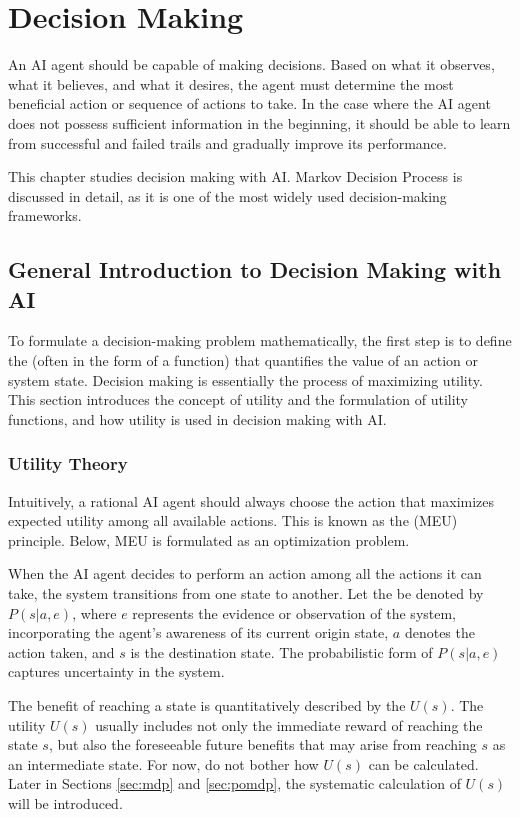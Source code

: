 \chapter{Decision Making}

An AI agent should be capable of making decisions. Based on what it observes, what it believes, and what it desires, the agent must determine the most beneficial action or sequence of actions to take. In the case where the AI agent does not possess sufficient information in the beginning, it should be able to learn from successful and failed trails and gradually improve its performance.

This chapter studies decision making with AI. Markov Decision Process is discussed in detail, as it is one of the most widely used decision-making frameworks.

\section{General Introduction to Decision Making with AI}

To formulate a decision-making problem mathematically, the first step is to define the  (often in the form of a function) that quantifies the value of an action or system state. Decision making is essentially the process of maximizing utility. This section introduces the concept of utility and the formulation of utility functions, and how utility is used in decision making with AI.

\subsection{Utility Theory}

Intuitively, a rational AI agent should always choose the action that maximizes expected utility among all available actions. This is known as the  (MEU) principle. Below, MEU is formulated as an optimization problem.

When the AI agent decides to perform an action among all the actions it can take, the system transitions from one state to another. Let the  be denoted by $P(s|a,e)$, where $e$ represents the evidence or observation of the system, incorporating the agent’s awareness of its current origin state, $a$ denotes the action taken, and $s$ is the destination state. The probabilistic form of $P(s|a,e)$ captures uncertainty in the system.

The benefit of reaching a state is quantitatively described by the  $U(s)$. The utility $U(s)$ usually includes not only the immediate reward of reaching the state $s$, but also the foreseeable future benefits that may arise from reaching $s$ as an intermediate state. For now, do not bother how $U(s)$ can be calculated. Later in Sections \ref{sec:mdp} and \ref{sec:pomdp}, the systematic calculation of $U(s)$ will be introduced.

